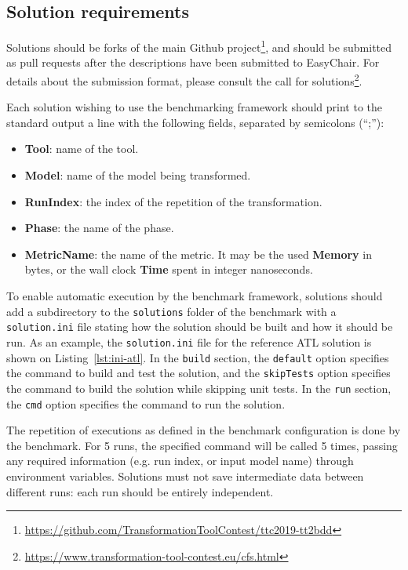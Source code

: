 \documentclass[a4paper]{scrartcl}
\newcommand*{\file}[1]{\texttt{#1}}
\begin{document}
\subsection{Solution requirements}
\label{sec:solut-requ}

Solutions should be forks of the main Github
project\footnote{\url{https://github.com/TransformationToolContest/ttc2019-tt2bdd}},
and should be submitted as pull requests after the descriptions have been
submitted to EasyChair. For details about the submission format, please consult
the call for
solutions\footnote{\url{https://www.transformation-tool-contest.eu/cfs.html}}.

Each solution wishing to use the benchmarking framework should print to the
standard output a line with the following fields, separated by semicolons
(``;''):

\begin{itemize}
\item \textbf{Tool}: name of the tool.
\item \textbf{Model}: name of the model being transformed.
\item \textbf{RunIndex}: the index of the repetition of the transformation.
\item \textbf{Phase}: the name of the phase.
\item \textbf{MetricName}: the name of the metric. It may be the used
  \textbf{Memory} in bytes, or the wall clock \textbf{Time} spent in integer
  nanoseconds.
\end{itemize}



To enable automatic execution by the benchmark framework, solutions should add a
subdirectory to the \file{solutions} folder of the benchmark with a
\file{solution.ini} file stating how the solution should be built and how it
should be run. As an example, the \file{solution.ini} file for the reference ATL
solution is shown on Listing~\ref{lst:ini-atl}. In the \file{build} section, the
\file{default} option specifies the command to build and test the solution, and
the \file{skipTests} option specifies the command to build the solution while
skipping unit tests. In the \file{run} section, the \file{cmd} option specifies
the command to run the solution.

The repetition of executions as defined in the benchmark configuration is done
by the benchmark. For 5 runs, the specified command will be called 5 times,
passing any required information (e.g. run index, or input model name) through
environment variables. Solutions must not save intermediate data between
different runs: each run should be entirely independent.
\end{document}
